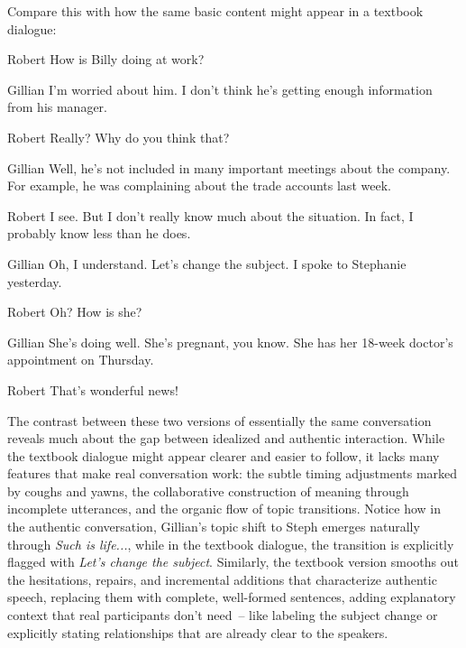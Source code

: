 Compare this with how the same basic content might appear in a textbook dialogue:

\ea
\begin{dialogue}
\item[Robert] How is Billy doing at work?

\item[Gillian] I'm worried about him. I don't think he's getting enough information from his manager.

\item[Robert] Really? Why do you think that?

\item[Gillian] Well, he's not included in many important meetings about the company. For example, he was complaining about the trade accounts last week.

\item[Robert] I see. But I don't really know much about the situation. In fact, I probably know less than he does.

\item[Gillian] Oh, I understand. Let's change the subject. I spoke to Stephanie yesterday.

\item[Robert] Oh? How is she?

\item[Gillian] She's doing well. She's pregnant, you know. She has her 18-week doctor's appointment on Thursday.

\item[Robert] That's wonderful news!
\end{dialogue}
\z

The contrast between these two versions of essentially the same conversation reveals much about the gap between idealized and authentic interaction. While the textbook dialogue might appear clearer and easier to follow, it lacks many features that make real conversation work: the subtle timing adjustments marked by coughs and yawns, the collaborative construction of meaning through incomplete utterances, and the organic flow of topic transitions. Notice how in the authentic conversation, Gillian's topic shift to Steph emerges naturally through \textit{Such is life...}, while in the textbook dialogue, the transition is explicitly flagged with \textit{Let's change the subject}. Similarly, the textbook version smooths out the hesitations, repairs, and incremental additions that characterize authentic speech, replacing them with complete, well-formed sentences, adding explanatory context that real participants don't need~-- like labeling the subject change or explicitly stating relationships that are already clear to the speakers.

